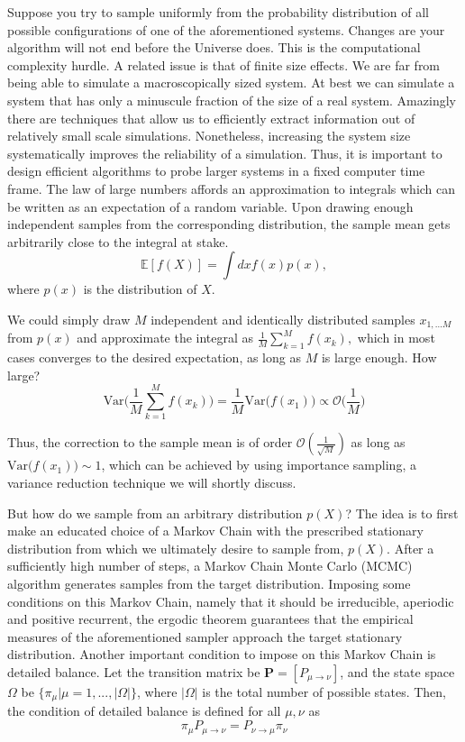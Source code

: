 Suppose you try to sample uniformly from the probability distribution of all possible configurations of one of the aforementioned systems.
Changes are your algorithm will not end before the Universe does.
This is the computational complexity hurdle.
A related issue is that of finite size effects.
We are far from being able to simulate a macroscopically sized system. 
At best we can simulate a system that has only a minuscule fraction of the size of a real system.
Amazingly there are techniques that allow us to efficiently extract information out of relatively small scale simulations.
Nonetheless, increasing the system size systematically improves the reliability of a simulation.
Thus, it is important to design efficient algorithms to probe larger  systems in a fixed computer time frame.
The law of large numbers affords an approximation to integrals which can be written as an expectation of a random variable. Upon drawing enough independent samples from the corresponding distribution, the sample mean gets arbitrarily close to the integral at stake.
\begin{equation}\label{eq:int_mean}
\mathbb{E} [f(X)] = \int dx f(x) p(x),
\end{equation}
where $p(x)$ is the distribution of $X$. 

We could simply draw $M$ independent and identically distributed samples $x_{1,...M}$ from $p(x)$ and approximate the integral as
$
\frac{1}{M} \sum_{k=1}^M f (x_k) , 
$
 which in most cases converges to the desired expectation, as long as $M$ is large enough. How large?
\begin{equation}\label{eq:variance}
\text{Var}\bigg( \frac{1}{M} \sum_{k=1}^M f(x_k) \bigg) = \frac{1}{M} \text{Var}\bigg( f(x_1) \bigg) \propto \mathcal{O}\bigg(\frac{1}{M}\bigg)
\end{equation}

Thus, the correction to the sample mean is of order $\mathcal{O}(\frac{1}{\sqrt{M}})$ as long as $\text{Var}\big( f(x_1) \big) \sim 1$, which can be achieved by using importance sampling, a variance reduction technique we will shortly discuss.

But how do we sample from an arbitrary distribution $p(X)$? The idea is to first make an educated choice of a Markov Chain with the prescribed stationary distribution from which we ultimately desire to sample from, $p(X)$. After a sufficiently high number of steps, a Markov Chain Monte Carlo (MCMC) algorithm generates samples from the target distribution. Imposing some conditions on this Markov Chain, namely that it should be irreducible, aperiodic and positive recurrent, the ergodic theorem guarantees that the empirical measures of the aforementioned sampler approach the target stationary distribution. Another important condition to impose on this Markov Chain is detailed balance. Let the transition matrix be $\bm P = [P_{\mu \rightarrow \nu}]$, and the state space $\Omega$ be $\{\pi_\mu | \mu=1, ..., |\Omega| \}$, where $|\Omega|$ is the total number of possible states. Then, the condition of detailed balance is defined for all $\mu, \nu$ as
\begin{equation}\label{eq:detBal}
\pi_\mu P_{\mu \rightarrow \nu} = P_{\nu \rightarrow \mu} \pi_\nu
\end{equation}

